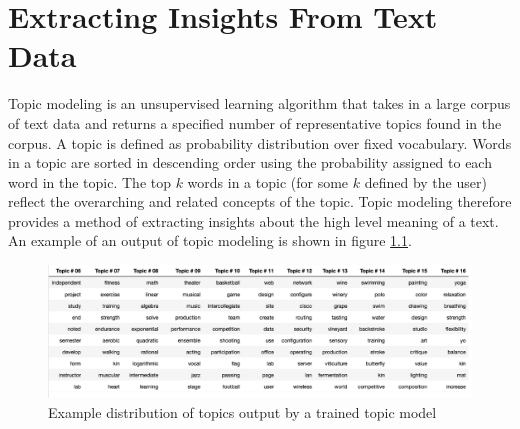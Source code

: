 
\chapter{Extracting Insights From Text Data}%
\label{sec:figs-and-tabs}

Topic modeling is an unsupervised learning algorithm that takes in a large corpus of text data and returns a specified number of representative topics found in the corpus. A topic is defined as probability distribution over fixed vocabulary. Words in a topic are sorted in descending order using the probability assigned to each word in the topic. The top $k$ words in a topic (for some $k$ defined by the user) reflect the overarching and related concepts of the topic. Topic modeling therefore provides a method of extracting insights about the high level meaning of a text. 
An example of an output of topic modeling is shown in figure \ref{fig:distribution}.
\begin{figure}[H]
    \centering
    \includegraphics[scale=0.35]{topic-distribution.png}
    \caption{Example distribution of topics output by a trained topic model}
    \label{fig:distribution}
\end{figure}

